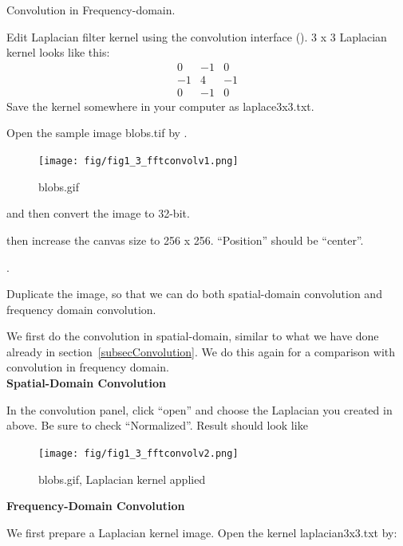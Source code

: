 \begin{indentexercise}{1} Convolution in Frequency-domain.

Edit Laplacian filter kernel using the convolution interface
(). 3 x 3 Laplacian kernel looks like
this:
\[
\begin{matrix}
0 & -1 & 0\\
-1 & 4 & -1\\
0 & -1 & 0
\end{matrix}
\]
Save the kernel somewhere in your computer as laplace3x3.txt.

Open the sample image blobs.tif by
.
\begin{figure}[htbp]
\begin{center}
\texttt{[image: fig/fig1\_3\_fftconvolv1.png]}
\caption{ blobs.gif}
\label{fig:fftconv1}
\end{center}
\end{figure}
and then convert the image to 32-bit.


then increase the canvas size to 256 x 256. ``Position'' should be ``center''.

. 

Duplicate the image, so that we can do both spatial-domain convolution and
frequency domain convolution. 

We first do the convolution in spatial-domain, similar to what we
have done already in section~\ref{subsecConvolution}. We do this again for
a comparison with convolution in frequency domain.\\

\textbf{Spatial-Domain Convolution}


In the convolution panel, click ``open'' and choose the Laplacian you created in
above. Be sure to check ``Normalized''. Result should look like
\begin{figure}[htbp]
\begin{center}
\texttt{[image: fig/fig1\_3\_fftconvolv2.png]}
\caption{ blobs.gif, Laplacian kernel applied}
\label{fig:fftconv2}
\end{center}
\end{figure}

\textbf{Frequency-Domain Convolution}

We first prepare a Laplacian kernel image. Open the kernel
laplacian3x3.txt by:


\end{indentexercise}
